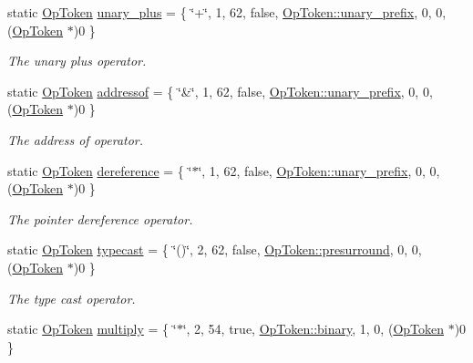 \begin{DoxyCompactItemize}
static \mbox{\hyperlink{class_op_token}{Op\+Token}} \mbox{\hyperlink{class_print_c_aa8b66477d2689e307a2fc49fd74d31c0}{unary\+\_\+plus}} = \{ \char`\"{}+\char`\"{}, 1, 62, false, \mbox{\hyperlink{class_op_token_af41c7f108d5662ede7765c5a6c44eaffa0d809c13f66611247b81856fc9e68289}{Op\+Token\+::unary\+\_\+prefix}}, 0, 0, (\mbox{\hyperlink{class_op_token}{Op\+Token}} $\ast$)0 \}
\begin{DoxyCompactList}\small\item\em The {\itshape unary} {\itshape plus} operator. \end{DoxyCompactList}\item 
static \mbox{\hyperlink{class_op_token}{Op\+Token}} \mbox{\hyperlink{class_print_c_a649c182bea1361be38d072a5c0cd4ec4}{addressof}} = \{ \char`\"{}\&\char`\"{}, 1, 62, false, \mbox{\hyperlink{class_op_token_af41c7f108d5662ede7765c5a6c44eaffa0d809c13f66611247b81856fc9e68289}{Op\+Token\+::unary\+\_\+prefix}}, 0, 0, (\mbox{\hyperlink{class_op_token}{Op\+Token}} $\ast$)0 \}
\begin{DoxyCompactList}\small\item\em The {\itshape address} {\itshape of} operator. \end{DoxyCompactList}\item 
static \mbox{\hyperlink{class_op_token}{Op\+Token}} \mbox{\hyperlink{class_print_c_a7d63db28ddbeb25416eeb5b5abffdf13}{dereference}} = \{ \char`\"{}$\ast$\char`\"{}, 1, 62, false, \mbox{\hyperlink{class_op_token_af41c7f108d5662ede7765c5a6c44eaffa0d809c13f66611247b81856fc9e68289}{Op\+Token\+::unary\+\_\+prefix}}, 0, 0, (\mbox{\hyperlink{class_op_token}{Op\+Token}} $\ast$)0 \}
\begin{DoxyCompactList}\small\item\em The {\itshape pointer} {\itshape dereference} operator. \end{DoxyCompactList}\item 
static \mbox{\hyperlink{class_op_token}{Op\+Token}} \mbox{\hyperlink{class_print_c_a62507aae00282b4100905ce34bedaab8}{typecast}} = \{ \char`\"{}()\char`\"{}, 2, 62, false, \mbox{\hyperlink{class_op_token_af41c7f108d5662ede7765c5a6c44eaffa883dcb2236a61ce30b67ac1da8b817b8}{Op\+Token\+::presurround}}, 0, 0, (\mbox{\hyperlink{class_op_token}{Op\+Token}} $\ast$)0 \}
\begin{DoxyCompactList}\small\item\em The {\itshape type} {\itshape cast} operator. \end{DoxyCompactList}\item 
static \mbox{\hyperlink{class_op_token}{Op\+Token}} \mbox{\hyperlink{class_print_c_ac4833401177651caf676e8e136ba35f1}{multiply}} = \{ \char`\"{}$\ast$\char`\"{}, 2, 54, true, \mbox{\hyperlink{class_op_token_af41c7f108d5662ede7765c5a6c44eaffa3a2ec63522a9329a71ddbe8adc3e752d}{Op\+Token\+::binary}}, 1, 0, (\mbox{\hyperlink{class_op_token}{Op\+Token}} $\ast$)0 \}

\end{DoxyCompactItemize}
